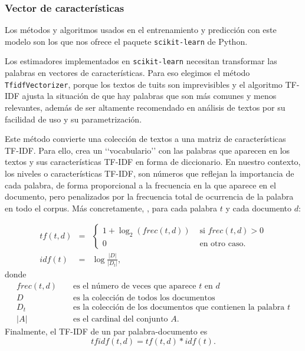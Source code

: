 \subsubsection{Vector de características}
Los métodos y algoritmos usados 
en el entrenamiento y predicción con este modelo son
los que nos ofrece el paquete {\tt  scikit-learn} de Python. 

Los estimadores implementados en {\tt  scikit-learn}
necesitan transformar las palabras en vectores de características. Para eso elegimos el método {\tt TfidfVectorizer},  porque los textos de tuits son imprevisibles y el algoritmo TF-IDF ajusta la situación de que hay palabras que son más comunes y menos relevantes, además de ser  altamente recomendado en análisis de textos por su facilidad de uso y su parametrización. 
  
Este método convierte una colección de textos
a una matriz de características TF-IDF. Para ello, crea un  \lq\lq vocabulario\rq\rq 
con las palabras que aparecen en los textos y sus características TF-IDF en forma de diccionario.
En nuestro contexto, los niveles o características TF-IDF, son números que reflejan la 
importancia de cada palabra, de forma proporcional a la frecuencia en la que
aparece en el documento, pero  penalizados por la frecuencia total de ocurrencia 
de la palabra en todo el corpus. Más concretamente, \cite{notas_alvaro}, 
para cada palabra $t$ y cada documento $d$:

$$\begin{array}{rcl}
tf(t,d) &=& \left\{\begin{array}{ll}
1+\log_2(frec(t,d)) &\mbox{ si }frec(t,d)>0\\
0&\mbox{ en otro caso.}
\end{array}\right.\\
idf(t) &=& \log\frac{|D|}{|D_t|},
\end{array}
$$
donde
\begin{eqnarray*}
frec(t,d) &&\mbox{ es el número de veces que aparece $t$ en $d$}\\
D&& \mbox{ es la colección de todos los documentos }\\
D_t&& \mbox{ es la colección de los documentos que contienen la palabra }t\\
|A| && \mbox{ es el cardinal del conjunto }A.
\end{eqnarray*}
Finalmente, el TF-IDF de un par palabra-documento es
$$tfidf(t,d)=tf(t,d)*idf(t).$$

